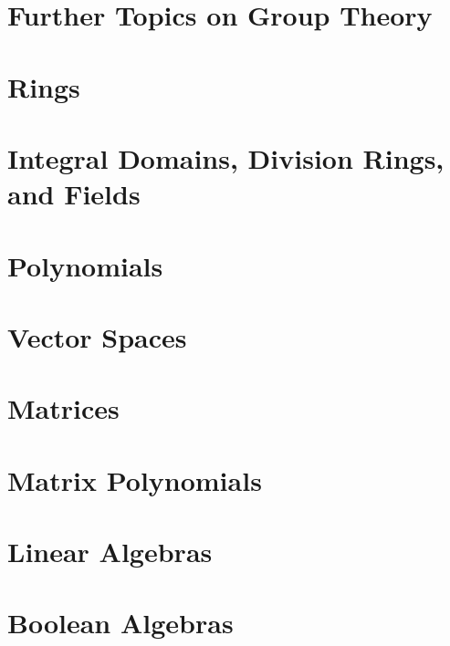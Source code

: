 \documentclass{book}
\begin{document}
\chapter{Further Topics on Group Theory}

\chapter{Rings}

\chapter{Integral Domains, Division Rings, and Fields}
\chapter{Polynomials}
\chapter{Vector Spaces}
\chapter{Matrices}
\chapter{Matrix Polynomials}
\chapter{Linear Algebras}
\chapter{Boolean Algebras}
\end{document}
